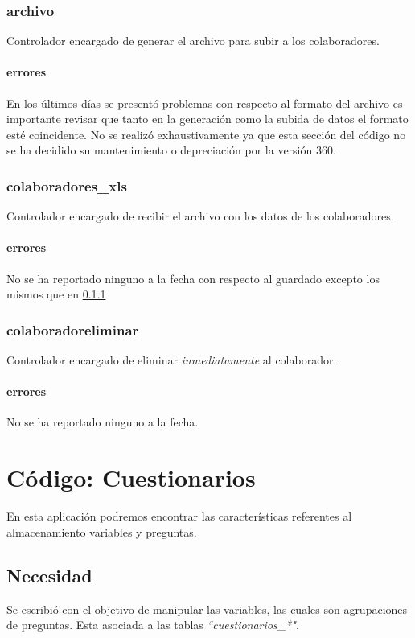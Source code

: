 \documentclass[10pt,a4paper]{book}
\begin{document}
	\subsection{archivo}
	Controlador encargado de generar el archivo para subir a los colaboradores.
	\subsubsection{errores}\label{e_archivo}
	En los últimos días se presentó problemas con respecto al formato del archivo es importante revisar que tanto en la generación como la subida de datos el formato esté coincidente. No se realizó exhaustivamente ya que esta sección del código no se ha decidido su mantenimiento o depreciación por la versión 360.

	\subsection{colaboradores\_xls}
	Controlador encargado de recibir el archivo con los datos de los colaboradores.
	\subsubsection{errores}
	No se ha reportado ninguno a la fecha con respecto al guardado excepto los mismos que en \ref{e_archivo}

	\subsection{colaboradoreliminar}
	Controlador encargado de eliminar \textit{inmediatamente} al colaborador.
	\subsubsection{errores}
	No se ha reportado ninguno a la fecha.


	\chapter{Código: Cuestionarios}
	
	En esta aplicación podremos encontrar las características referentes al almacenamiento variables y preguntas.
	
	\section{Necesidad}
	
	Se escribió con el objetivo de manipular las variables, las cuales son agrupaciones de preguntas. Esta asociada a las tablas  \textit{``cuestionarios\_*"}. 
	
\end{document}
